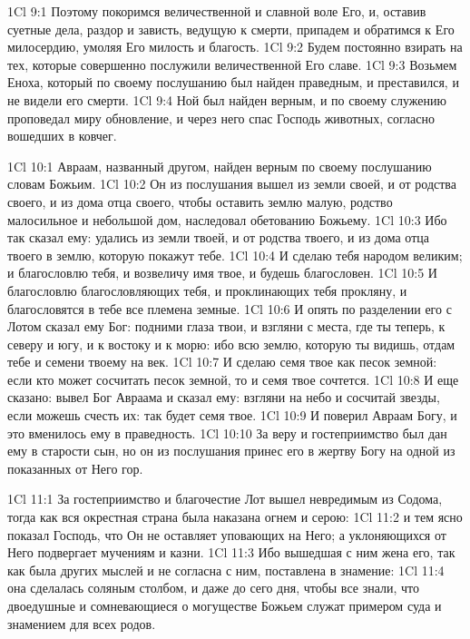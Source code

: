 \vs 1Cl 9:1
Поэтому покоримся
величественной и славной воле Его, и, оставив суетные дела, раздор и зависть,
ведущую к смерти, припадем и обратимся к Его милосердию, умоляя Его милость и
благость.
\vs 1Cl 9:2
Будем постоянно взирать на
тех, которые совершенно послужили величественной Его славе.
\vs 1Cl 9:3
Возьмем Еноха, который по
своему послушанию был найден праведным, и преставился, и не видели его смерти.
\vs 1Cl 9:4
Ной был найден верным, и
по своему служению проповедал миру обновление, и через него спас Господь
животных, согласно вошедших в ковчег.

\vs 1Cl 10:1
Авраам, названный другом,
найден верным по своему послушанию словам Божьим.
\vs 1Cl 10:2
Он из послушания вышел из
земли своей, и от родства своего, и из дома отца своего, чтобы оставить землю
малую, родство малосильное и небольшой дом, наследовал обетованию Божьему.
\vs 1Cl 10:3
Ибо так сказал ему:
удались из земли твоей, и от родства твоего, и из дома отца твоего в землю,
которую покажут тебе.
\vs 1Cl 10:4
И сделаю тебя народом
великим; и благословлю тебя, и возвеличу имя твое, и будешь благословен.
\vs 1Cl 10:5
И благословлю
благословляющих тебя, и проклинающих тебя прокляну, и благословятся в тебе все
племена земные.
\vs 1Cl 10:6
И опять по разделении его
с Лотом сказал ему Бог: подними глаза твои, и взгляни с места, где ты теперь,
к северу и югу, и к востоку и к морю: ибо всю землю, которую ты видишь, отдам
тебе и семени твоему на век.
\vs 1Cl 10:7
И сделаю семя твое как
песок земной: если кто может сосчитать песок земной, то и семя твое сочтется.
\vs 1Cl 10:8
И еще сказано: вывел Бог
Авраама и сказал ему: взгляни на небо и сосчитай звезды, если можешь счесть
их: так будет семя твое.
\vs 1Cl 10:9
И поверил Авраам Богу, и
это вменилось ему в праведность.
\vs 1Cl 10:10
За веру и гостеприимство
был дан ему в старости сын, но он из послушания принес его в жертву Богу на
одной из показанных от Него гор.

\vs 1Cl 11:1
За гостеприимство и
благочестие Лот вышел невредимым из Содома, тогда как вся окрестная страна
была наказана огнем и серою:
\vs 1Cl 11:2
и тем ясно показал
Господь, что Он не оставляет уповающих на Него; а уклоняющихся от Него
подвергает мучениям и казни.
\vs 1Cl 11:3
Ибо вышедшая с ним жена
его, так как была других мыслей и не согласна с ним, поставлена в знамение:
\vs 1Cl 11:4
она сделалась соляным
столбом, и даже до сего дня, чтобы все знали, что двоедушные и сомневающиеся о
могуществе Божьем служат примером суда и знамением для всех родов.

